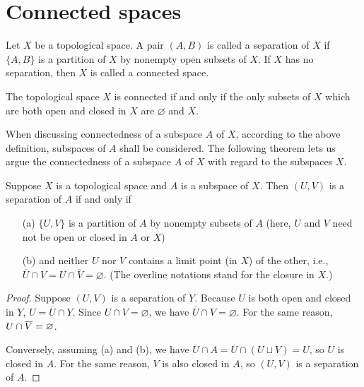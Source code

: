\section{Connected spaces}

\begin{defi}
    Let $X$ be a topological space.
    A pair $(A, B)$ is called a separation of $X$ if $\{A, B\}$ is a partition of $X$ by nonempty open subsets of $X$.
    If $X$ has no separation, then $X$ is called a connected space.
\end{defi}
\begin{rmk}
    The topological space $X$ is connected if and only if the only subsets of $X$ which are both open and closed in $X$ are $\varnothing$ and $X$.
\end{rmk}

When discussing connectedness of a subspace $A$ of $X$, according to the above definition, subspaces of $A$ shall be considered.
The following theorem lets us argue the connectedness of a subspace $A$ of $X$ with regard to the subspaces $X$.
\begin{thm}
    Suppose $X$ is a topological space and $A$ is a subspace of $X$.
    Then $(U, V)$ is a separation of $A$ if and only if
    \begin{enumerate}
        \item[(a)]
        {
            $\{U, V\}$ is a partition of $A$ by nonempty subsets of $A$ (here, $U$ and $V$ need not be open or closed in $A$ or $X$)
        }
        \item[(b)]
        {
            and neither $U$ nor $V$ contains a limit point (in $X$) of the other, i.e., $\overline{U}\cap V=U\cap\overline{V}=\varnothing$. (The overline notations stand for the closure in $X$.)
        }
    \end{enumerate}
\end{thm}
\begin{proof}
    Suppose $(U, V)$ is a separation of $Y$.
    Because $U$ is both open and closed in $Y$, $U=\overline{U}\cap Y$.
    Since $U\cap V=\varnothing$, we have $\overline{U}\cap V=\varnothing$.
    For the same reason, $U\cap\overline{V}=\varnothing$.

    Conversely, assuming (a) and (b), we have $\overline{U}\cap A=\overline{U}\cap(U\sqcup V)=U$, so $U$ is closed in $A$.
    For the same reason, $V$ is also closed in $A$, so $(U, V)$ is a separation of $A$.
\end{proof}

